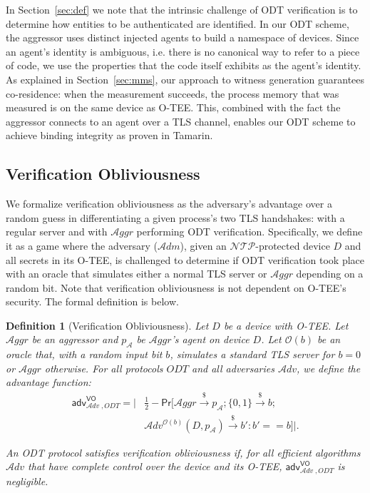 \documentclass[letterpaper,twocolumn,10pt]{article}
\newcommand{\T}{\ensuremath{\mathcal{A}ggr}\xspace}
\newcommand{\N}{\ensuremath{\mathcal{N\!T}\mathcal{\!P}}\xspace}
\newcommand{\ADM}{\ensuremath{\mathcal{A}dm}\xspace}
\newcommand{\alg}[1]{\mathsf{#1}}
\newcommand{\adv}{\mathcal{A}dv}
\newcommand{\PR}{\mathsf{Pr}}
\newcommand{\riar}{\xrightarrow{\$}}
\newcommand{\OO}{\mathcal{O}}
\newcommand{\advantage}[2]{\alg{adv}^{#1}_{\adv\;\!,#2}}
\newtheorem{definition}{Definition}
\begin{document}
In Section~\ref{sec:def} we note that the intrinsic challenge of ODT verification is to determine how entities to be authenticated are identified.
In our ODT scheme, the aggressor uses distinct injected agents to build a namespace of devices.
Since an agent's identity is ambiguous, i.e. there is no canonical way to refer to a piece of code, we use the properties that the code itself exhibits as the agent's identity.
As explained in Section~\ref{sec:mms}, our approach to witness generation guarantees co-residence:  when the measurement succeeds,
the process memory that was measured is on the same device as O-TEE.
This, combined with the fact the aggressor connects to an agent over a TLS channel, enables our ODT scheme to achieve binding integrity as proven in Tamarin.

\subsection{Verification Obliviousness}
\label{sec:verif-obliv}

We formalize verification obliviousness as the adversary's advantage over a random guess in differentiating a given process's two TLS handshakes: with a regular server and with \T performing ODT verification. Specifically, we define it as a game where the adversary (\ADM), given an \N-protected device $D$ and all secrets in its O-TEE, is challenged to determine if ODT verification took place with an oracle that simulates either a normal TLS server or \T depending on a random bit.
Note that verification obliviousness is not dependent on O-TEE's security.
The formal definition is below.

\begin{definition}[Verification Obliviousness]
\label{def:obl}
  Let $D$ be a device with O-TEE.
  Let \T be an aggressor and $p_{\mathcal{A}}$ be \T's agent on device $D$.
  Let $\OO(b)$ be an oracle that, with a random input bit $b$, simulates a standard TLS server for $b=0$ or \T otherwise.
  For all protocols $\mathit{ODT}$ and all adversaries $\adv$,
  we define the advantage function:
    \begin{equation*}
    \begin{split}
      \advantage{\mathsf{VO}}{\mathit{ODT}} = \bigg| & \frac{1}{2} - \PR \Big[ \T \riar p_{\mathcal{A}}; \{0, 1\} \riar b; \\
      & \adv^{\OO(b)}(D, p_{\mathcal{A}}) \riar b': b' == b \Big] \bigg|.
    \end{split}
  \end{equation*}

  An ODT protocol satisfies verification obliviousness if, for
  all efficient algorithms $\adv$ that have complete control over the device and its O-TEE, $\advantage{\mathsf{VO}}{\mathit{ODT}}$ is negligible.
\end{definition}
\end{document}

